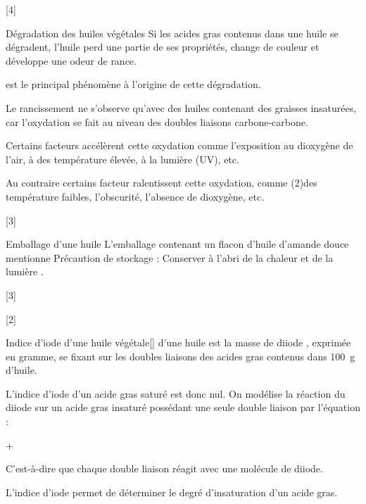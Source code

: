 \newpage
\vspace*{-30pt}
[4]


\begin{doc}{Dégradation des huiles végétales}
  Si les acides gras contenus dans une huile se dégradent, l’huile perd une partie de ses propriétés, change de couleur et développe une odeur de rance.
  \begin{importants}  
     est le principal phénomène à l’origine de cette dégradation.
  \end{importants}
  Le rancissement ne s'observe qu'avec des huiles contenant des graisses insaturées, car l'oxydation se fait au niveau des doubles liaisons carbone-carbone.
  \begin{importants}  
    Certains facteurs accélèrent cette oxydation comme l’exposition au dioxygène de l’air, à des température élevée, à la lumière (UV), etc.
  \end{importants}
  \begin{importants}
    Au contraire certains facteur ralentissent cette oxydation, comme \texteTrou(2){des température faibles, l'obscurité, l'absence de dioxygène, etc.}
  \end{importants}
\end{doc}


[3]

\begin{doc}{Emballage d'une huile}
  L'emballage contenant un flacon d'huile d'amande douce mentionne \og Précaution de stockage : Conserver à l’abri de la chaleur et de la lumière \fg.
\end{doc}

[3]

[2]

\begin{doc}{Indice d’iode d’une huile végétale}[\label{doc:indice_iode}]
   d'une huile est la masse de diiode \diiode, exprimée en gramme, se fixant sur les doubles liaisons des acides gras contenus dans \qty{100}{g} d’huile.
  
  L'indice d'iode d'un acide gras saturé est donc nul.
  On modélise la réaction du diiode \diiode sur un acide gras insaturé possédant une seule double liaison par l’équation :
  \begin{center}
     + \diiode \reaction {}
  \end{center}
  C'est-à-dire que chaque double liaison réagit avec une molécule de diiode.

  \begin{importants}
    L'indice d'iode permet de déterminer le degré d'insaturation d'un acide gras.
  \end{importants}
\end{doc}

